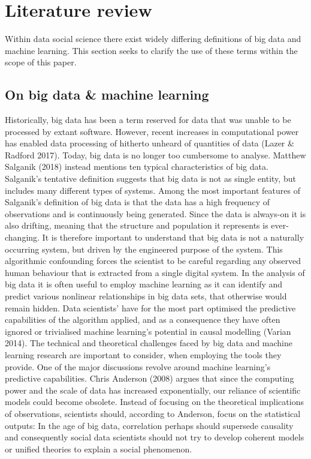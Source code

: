 \documentclass[10pt,a4paper]{report}
\begin{document}
\section{Literature review}
Within data social science there exist widely differing definitions of big data and machine learning. This section seeks to clarify the use of these terms within the scope of this paper.
\subsection{On big data \& machine learning}
Historically, big data has been a term reserved for data that was unable to be processed by extant software. However, recent increases in computational power has enabled data processing of hitherto unheard of quantities of data (Lazer \& Radford 2017). Today, big data is no longer too cumbersome to analyse. Matthew Salganik (2018) instead mentions ten typical characteristics of big data. Salganik's tentative definition suggests that big data is not as single entity, but includes many different types of systems. Among the most important features of Salganik's definition of big data is that the data has a high frequency of observations and is continuously being generated. Since the data is always-on it is also drifting, meaning that the structure and population it represents is ever-changing. It is therefore important to understand that big data is not a naturally occurring system, but driven by the engineered purpose of the system. This algorithmic confounding forces the scientist to be careful regarding any observed human behaviour that is extracted from a single digital system.\newline
In the analysis of big data it is often useful to employ machine learning as it can identify and predict various nonlinear relationships in big data sets, that otherwise would remain hidden. Data scientists' have for the most part optimised the predictive capabilities of the algorithm applied, and as a consequence they have often ignored or trivialised machine learning's potential in causal modelling (Varian 2014).\newline
The technical and theoretical challenges faced by big data and machine learning research are important to consider, when employing the tools they provide. One of the major discussions revolve around machine learning's predictive capabilities. Chris Anderson (2008) argues that since the computing power and the scale of data has increased exponentially, our reliance of scientific models could become obsolete. Instead of focusing on the theoretical implications of observations, scientists should, according to Anderson, focus on the statistical outputs: In the age of big data, correlation perhaps should supersede causality and consequently social data scientists should not try to develop coherent models or unified theories to explain a social phenomenon.\newline
\end{document}
